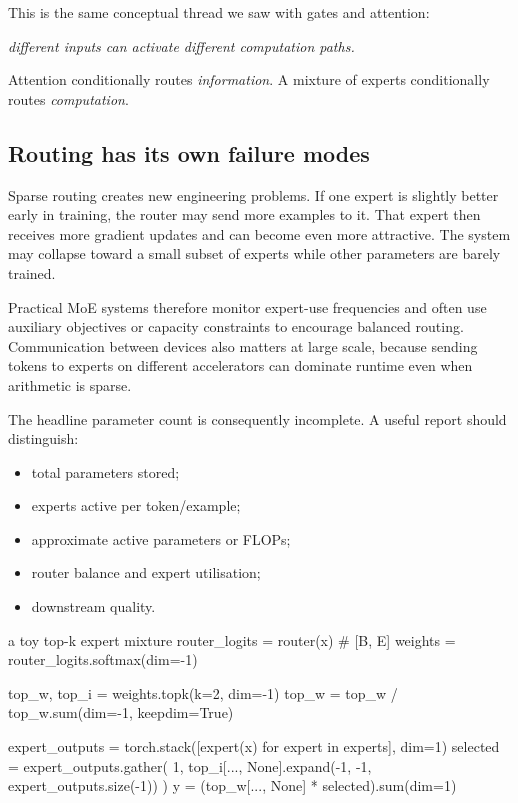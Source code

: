 This is the same conceptual thread we saw with gates and attention:
\begin{center}
  \emph{different inputs can activate different computation paths.}
\end{center}

Attention conditionally routes \emph{information}. A mixture of experts conditionally routes \emph{computation}.

\subsection{Routing has its own failure modes}

Sparse routing creates new engineering problems. If one expert is slightly better early in training, the router may send more examples to it. That expert then receives more gradient updates and can become even more attractive. The system may collapse toward a small subset of experts while other parameters are barely trained.

Practical MoE systems therefore monitor expert-use frequencies and often use auxiliary objectives or capacity constraints to encourage balanced routing. Communication between devices also matters at large scale, because sending tokens to experts on different accelerators can dominate runtime even when arithmetic is sparse.

The headline parameter count is consequently incomplete. A useful report should distinguish:
\begin{itemize}[leftmargin=*]
  \item total parameters stored;
  \item experts active per token/example;
  \item approximate active parameters or FLOPs;
  \item router balance and expert utilisation;
  \item downstream quality.
\end{itemize}

\begin{pytorchbox}{a toy top-k expert mixture}
router_logits = router(x)                 # [B, E]
weights = router_logits.softmax(dim=-1)

top_w, top_i = weights.topk(k=2, dim=-1)
top_w = top_w / top_w.sum(dim=-1, keepdim=True)

expert_outputs = torch.stack([expert(x) for expert in experts], dim=1)
selected = expert_outputs.gather(
    1, top_i[..., None].expand(-1, -1, expert_outputs.size(-1))
)
y = (top_w[..., None] * selected).sum(dim=1)
\end{pytorchbox}

